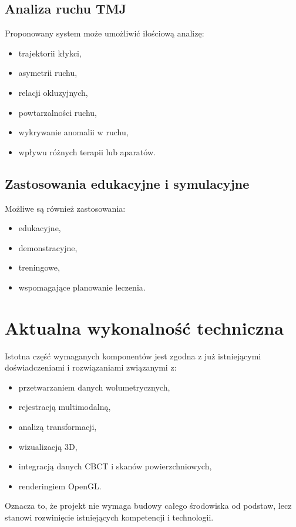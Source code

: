 \documentclass[11pt,a4paper]{article}
\begin{document}
\subsection{Analiza ruchu TMJ}

Proponowany system może umożliwić ilościową analizę:
\begin{itemize}
\item trajektorii kłykci,
\item asymetrii ruchu,
\item relacji okluzyjnych,
\item powtarzalności ruchu,
\item wykrywanie anomalii w ruchu,
\item wpływu różnych terapii lub aparatów.
\end{itemize}

\subsection{Zastosowania edukacyjne i symulacyjne}

Możliwe są również zastosowania:
\begin{itemize}
\item edukacyjne,
\item demonstracyjne,
\item treningowe,
\item wspomagające planowanie leczenia.
\end{itemize}

\section{Aktualna wykonalność techniczna}

Istotna część wymaganych komponentów jest zgodna z już istniejącymi doświadczeniami i rozwiązaniami związanymi z:
\begin{itemize}
\item przetwarzaniem danych wolumetrycznych,
\item rejestracją multimodalną,
\item analizą transformacji,
\item wizualizacją 3D,
\item integracją danych CBCT i skanów powierzchniowych,
\item renderingiem OpenGL.
\end{itemize}

Oznacza to, że projekt nie wymaga budowy całego środowiska od podstaw, lecz stanowi rozwinięcie istniejących kompetencji i technologii.
\end{document}
